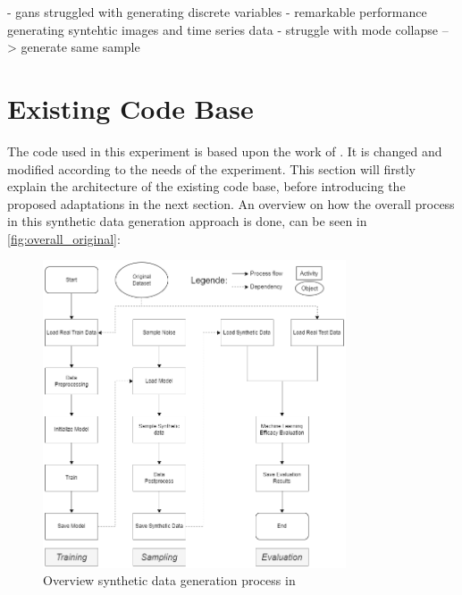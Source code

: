 
- gans struggled with generating discrete variables \cite{torfi2020CorGANCorrelationCapturingConvolutionala}
- remarkable performance generating syntehtic images and time series data \cite{mckeever2020SynthesisingTabularDatasets}
- struggle with mode collapse --> generate same sample \cite{torfi2020CorGANCorrelationCapturingConvolutionala}

\section{Existing Code Base}
\label{ch:conceptualDesign-existingCodeBase}

The code \cite{akim2023TabDDPMModellingTabular} used in this experiment is based upon the work of \cite{kotelnikov2022TabDDPMModellingTabular}.
It is changed and modified according to the needs of the experiment. 
This section will firstly explain the architecture of the existing code base, before introducing the proposed adaptations in the next section.
An overview on how the overall process in this synthetic data generation approach is done, can be seen in \autoref{fig:overall_original}:


\begin{figure}[h]
    \centering
    \includegraphics[width=0.8\textwidth]{images/Overall_original.png}
    \caption{Overview synthetic data generation process in \cite{akim2023TabDDPMModellingTabular}}
    \label{fig:overall_original}
\end{figure}


